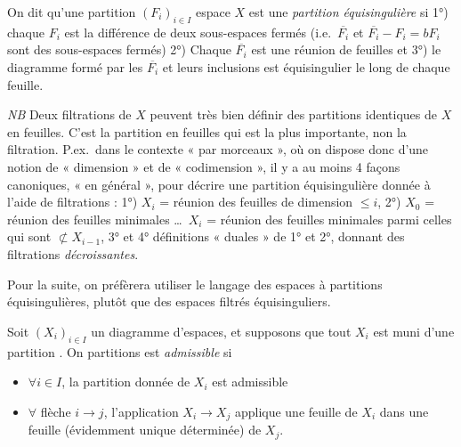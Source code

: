 \documentclass[11pt,a4paper]{article}
\begin{document}
On dit qu'une partition $(F_i)_{i \in I}$    espace $X$  est
une \emph{partition équisingulière} si 1°) chaque $F_i$ est la différence de
deux sous-espaces fermés (i.e.\ $\overline{F_i}$ et $\overline{F_i} - F_i =
bF_i$ sont des sous-espaces fermés) 2°) Chaque $\overline{F_i}$ est une
réunion de feuilles et 3°) le diagramme formé par  les
$\overline{F_i}$ et leurs inclusions est équisingulier le long de chaque
feuille.


\emph{NB} Deux filtrations \struck{\ill{}}  de $X$
peuvent très bien définir des \struck{\ill{}} partitions identiques de $X$
en feuilles. C'est la partition en feuilles qui est la plus importante,
non la filtration. P.ex.\ dans le contexte « par morceaux », où on dispose
donc d'une notion de « dimension » et de « codimension », il y a au moins 4
façons canoniques, \struck{\ill{}}  « en général », pour
décrire une partition équisingulière donnée à l'aide de filtrations : 1°)
$X_i$ = réunion des feuilles de dimension $\leq i$, 2°) $X_0$ = réunion des
feuilles minimales \ldots\ $X_i$ = réunion des feuilles minimales parmi
celles qui sont $\not\subset X_{i-1}$, 3° et 4° définitions « duales » de
1° et 2°, donnant des filtrations \emph{décroissantes}.

Pour la suite, on préfèrera utiliser le langage des espaces à partitions
équisingulières, plutôt que des espaces filtrés équisinguliers.


Soit $(X_i)_{i \in I}$ un diagramme d'espaces, et supposons que tout $X_i$
est muni d'une partition . On   
 partitions est \emph{admissible} si
\begin{itemize}
  \item[a)] $\forall i \in I$, la partition donnée de $X_i$ est admissible
  \item[b)] $\forall$ flèche $i \to j$, l'application $X_i \to X_j$ applique
  une feuille de $X_i$ dans une feuille (évidemment unique déterminée) de
  $X_j$.
\end{itemize}
\end{document}
